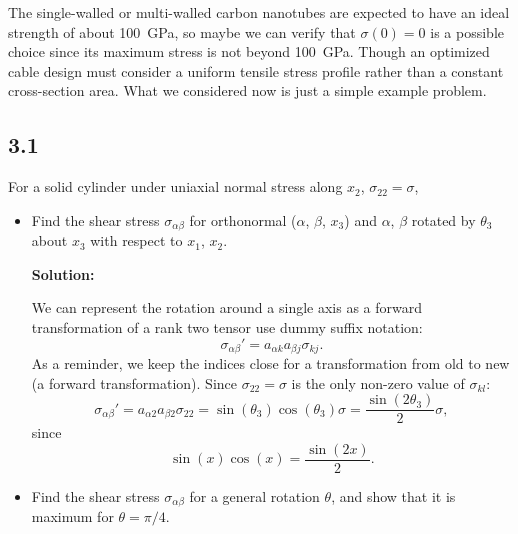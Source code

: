 \documentclass[12pt]{article}
\begin{document}
The single-walled or multi-walled carbon nanotubes are expected to have an ideal strength of about
\SI{100}{\giga\pascal},\cite{pugno2006strength}
so maybe we can verify that $\sigma(0) = 0$ is a possible choice since its maximum stress is not beyond \SI{100}{\giga\pascal}.
Though an optimized cable design must consider a uniform tensile stress profile rather than a constant
cross-section area.\cite{pugno2006strength} What we considered now is just a simple example problem.

\subsection{3.1}
For a solid cylinder under uniaxial normal stress along $x_2$, $\sigma_{22} = \sigma$,
\begin{itemize}
	\item Find the shear stress $\sigma_{\alpha\beta}$ for orthonormal ($\alpha$, $\beta$, $x_3$)
	      and $\alpha$, $\beta$ rotated by $\theta_3$ about $x_3$ with respect to $x_1$, $x_2$.

	      \textbf{Solution:}

	      We can represent the rotation around a single axis as a forward transformation of a rank two tensor use
	      dummy suffix notation:
	      \begin{equation}
		      \sigma_{\alpha\beta}' = a_{\alpha k} a_{\beta j} \sigma_{kj}.
	      \end{equation}
	      As a reminder, we keep the indices close for a transformation from old to new (a forward transformation).
	      Since $\sigma_{22} = \sigma$ is the only non-zero value of $\sigma_{kl}$:
	      \begin{equation}
		      \sigma_{\alpha\beta}' = a_{\alpha 2} a_{\beta 2} \sigma_{22} = \sin(\theta_3) \cos(\theta_3) \sigma = \frac{\sin(2\theta_3)}{2} \sigma,
	      \end{equation}
	      since
	      \begin{equation}
		      \sin(x) \cos(x) = \frac{\sin(2x)}{2}.
	      \end{equation}
	\item Find the shear stress $\sigma_{\alpha\beta}$ for a general rotation $\theta$,
	      and show that it is maximum for $\theta = \pi/4$.


\end{itemize}
\end{document}
